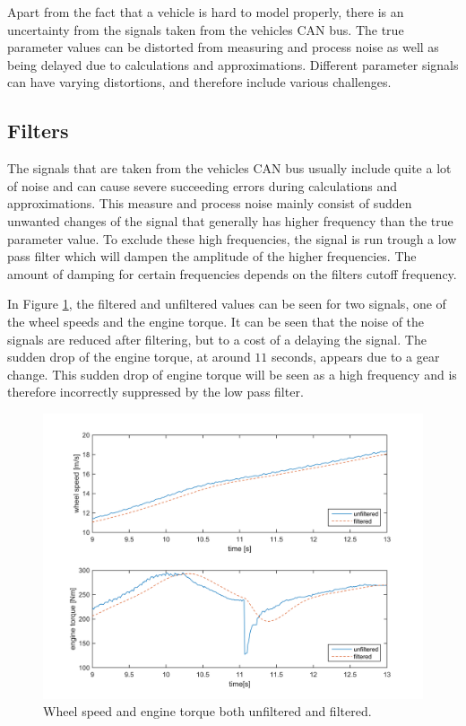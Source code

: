 Apart from the fact that a vehicle is hard to model properly, there is an uncertainty from the signals taken from the vehicles CAN bus. The true parameter values can be distorted from measuring and process noise as well as being delayed due to calculations and approximations. Different parameter signals can have varying distortions, and therefore include various challenges.

\subsection{Filters}

The signals that are taken from the vehicles CAN bus usually include quite a lot of noise and can cause severe succeeding errors during calculations and approximations. This measure and process noise mainly consist of sudden unwanted changes of the signal that generally has higher frequency than the true parameter value. To exclude these high frequencies, the signal is run trough a low pass filter which will dampen the amplitude of the higher frequencies. The amount of damping for certain frequencies depends on the filters cutoff frequency. 

In Figure \ref{filter_and_no}, the filtered and unfiltered values can be seen for two signals, one of the wheel speeds and the engine torque. It can be seen that the noise of the signals are reduced after filtering, but to a cost of a delaying the signal. The sudden drop of the engine torque, at around $ 11 $ seconds, appears due to a gear change. This sudden drop of engine torque will be seen as a high frequency and is therefore incorrectly suppressed by the low pass filter.

\begin{figure}[h]
	\centering
	\includegraphics[width=1.0\textwidth]{Pictures/filter_and_no}
	\caption {Wheel speed and engine torque both unfiltered and filtered.}
	\label{filter_and_no}
\end{figure}

